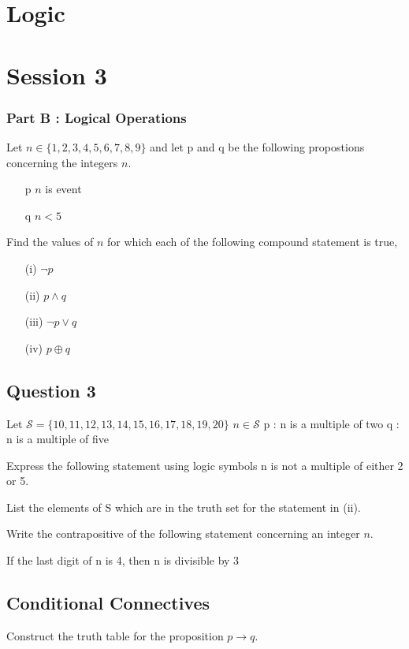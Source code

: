 \documentclass[]{report}
\begin{document}
\chapter{Logic}

\chapter{Session 3}


\subsection*{Part B : Logical Operations}
Let $n \in \{1,2,3,4,5,6,7,8,9\}$ and let p and q be the following propostions concerning 
the integers $n$.

\begin{itemize}
	\item[p] $n$ is event
	\item[q] $n<5$
\end{itemize}

Find the values of $n$ for which each of the following compound statement is true,

\begin{itemize}
	\item[(i)] $\neg p$
	\item[(ii)] $p \wedge q$
	\item[(iii)] $\neg p \vee q$ 
	\item[(iv)] $p \oplus q$
\end{itemize}

\section*{Question 3}

Let $\mathcal{S} = \{10,11,12,13,14,15,16,17,18,19,20\}$
$n  \in \mathcal{S}$
p : n is a multiple of two
q : n is a multiple of five

Express the following statement using logic symbols
n is not a multiple of either 2 or 5.

List the elements of S which are in the truth set for the statement in (ii).

Write the contrapositive of the following statement concerning an integer $n$.

If the last digit of n is 4, then n is divisible by 3

\section{Conditional Connectives}
Construct the truth table for the proposition $p \rightarrow q$.
\end{document}

